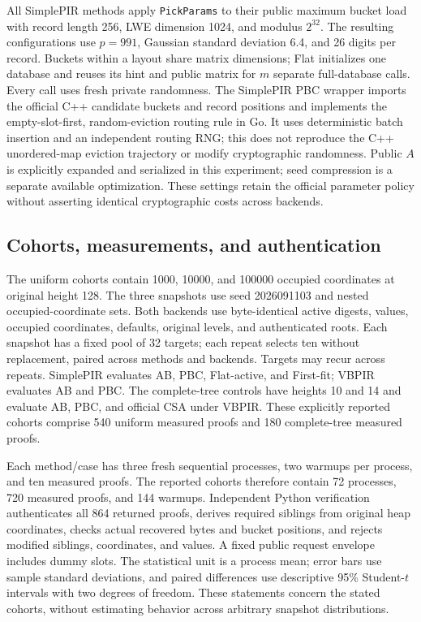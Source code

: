 All SimplePIR methods apply \texttt{PickParams} to their public maximum bucket load with record length 256, LWE dimension 1024, and modulus $2^{32}$. The resulting configurations use $p=991$, Gaussian standard deviation 6.4, and 26 digits per record. Buckets within a layout share matrix dimensions; Flat initializes one database and reuses its hint and public matrix for $m$ separate full-database calls. Every call uses fresh private randomness. The SimplePIR PBC wrapper imports the official C++ candidate buckets and record positions and implements the empty-slot-first, random-eviction routing rule in Go. It uses deterministic batch insertion and an independent routing RNG; this does not reproduce the C++ unordered-map eviction trajectory or modify cryptographic randomness. Public $A$ is explicitly expanded and serialized in this experiment; seed compression is a separate available optimization. These settings retain the official parameter policy without asserting identical cryptographic costs across backends.

\subsection{Cohorts, measurements, and authentication}

The uniform cohorts contain 1000, 10000, and 100000 occupied coordinates at original height 128. The three snapshots use seed 2026091103 and nested occupied-coordinate sets. Both backends use byte-identical active digests, values, occupied coordinates, defaults, original levels, and authenticated roots. Each snapshot has a fixed pool of 32 targets; each repeat selects ten without replacement, paired across methods and backends. Targets may recur across repeats. SimplePIR evaluates AB, PBC, Flat-active, and First-fit; VBPIR evaluates AB and PBC. The complete-tree controls have heights 10 and 14 and evaluate AB, PBC, and official CSA under VBPIR. These explicitly reported cohorts comprise 540 uniform measured proofs and 180 complete-tree measured proofs.

Each method/case has three fresh sequential processes, two warmups per process, and ten measured proofs. The reported cohorts therefore contain 72 processes, 720 measured proofs, and 144 warmups. Independent Python verification authenticates all 864 returned proofs, derives required siblings from original heap coordinates, checks actual recovered bytes and bucket positions, and rejects modified siblings, coordinates, and values. A fixed public request envelope includes dummy slots. The statistical unit is a process mean; error bars use sample standard deviations, and paired differences use descriptive 95\% Student-$t$ intervals with two degrees of freedom. These statements concern the stated cohorts, without estimating behavior across arbitrary snapshot distributions.

